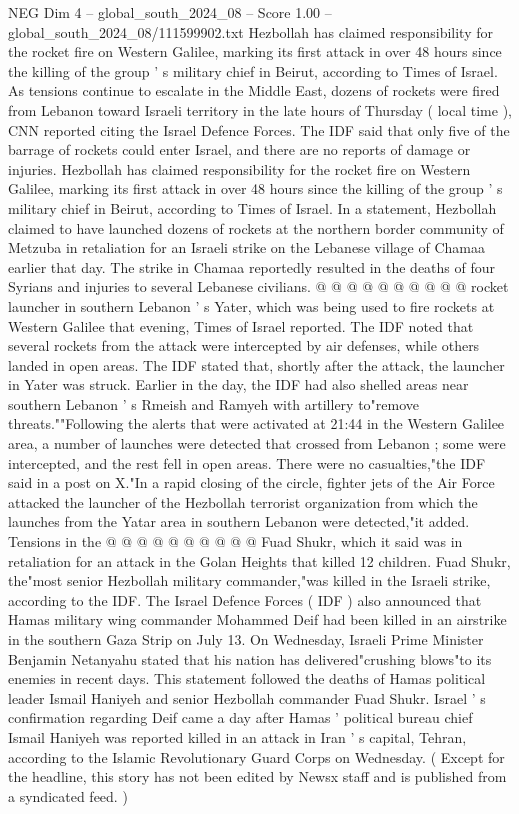 \begin{textsample}{NEG Dim 4 – global\_south\_2024\_08 – Score 1.00 – global\_south\_2024\_08/111599902.txt}  \label{ex:f4_neg_331}
Hezbollah has claimed responsibility for the rocket fire on Western Galilee, marking its first attack in over 48 hours since the killing of the group ' s military chief in Beirut, according to Times of Israel.
As tensions continue to escalate in the Middle East, dozens of rockets were fired from Lebanon toward Israeli territory in the late hours of Thursday ( local time ), CNN reported citing the Israel Defence Forces.
The IDF said that only five of the barrage of rockets could enter Israel, and there are no reports of damage or injuries.
Hezbollah has claimed responsibility for the rocket fire on Western Galilee, marking its first attack in over 48 hours since the killing of the group ' s military chief in Beirut, according to Times of Israel.
In a statement, Hezbollah claimed to have launched dozens of rockets at the northern border community of Metzuba in retaliation for an Israeli strike on the Lebanese village of Chamaa earlier that day.
The strike in Chamaa reportedly resulted in the deaths of four Syrians and injuries to several Lebanese civilians. @ @ @ @ @ @ @ @ @ @ rocket launcher in southern Lebanon ' s Yater, which was being used to fire rockets at Western Galilee that evening, Times of Israel reported.
The IDF noted that several rockets from the attack were intercepted by air defenses, while others landed in open areas.
The IDF stated that, shortly after the attack, the launcher in Yater was struck.
Earlier in the day, the IDF had also shelled areas near southern Lebanon ' s Rmeish and Ramyeh with artillery to"remove threats.""Following the alerts that were activated at 21:44 in the Western Galilee area, a number of launches were detected that crossed from Lebanon ; some were intercepted, and the rest fell in open areas.
There were no casualties,"the IDF said in a post on X."In a rapid closing of the circle, fighter jets of the Air Force attacked the launcher of the Hezbollah terrorist organization from which the launches from the Yatar area in southern Lebanon were detected,"it added.
Tensions in the @ @ @ @ @ @ @ @ @ @ Fuad Shukr, which it said was in retaliation for an attack in the Golan Heights that killed 12 children.
Fuad Shukr, the"most senior Hezbollah military commander,"was killed in the Israeli strike, according to the IDF.
The Israel Defence Forces ( IDF ) also announced that Hamas military wing commander Mohammed Deif had been killed in an airstrike in the southern Gaza Strip on July 13.
On Wednesday, Israeli Prime Minister Benjamin Netanyahu stated that his nation has delivered"crushing blows"to its enemies in recent days.
This statement followed the deaths of Hamas political leader Ismail Haniyeh and senior Hezbollah commander Fuad Shukr.
Israel ' s confirmation regarding Deif came a day after Hamas ' political bureau chief Ismail Haniyeh was reported killed in an attack in Iran ' s capital, Tehran, according to the Islamic Revolutionary Guard Corps on Wednesday. ( Except for the headline, this story has not been edited by Newsx staff and is published from a syndicated feed. )

\end{textsample}

